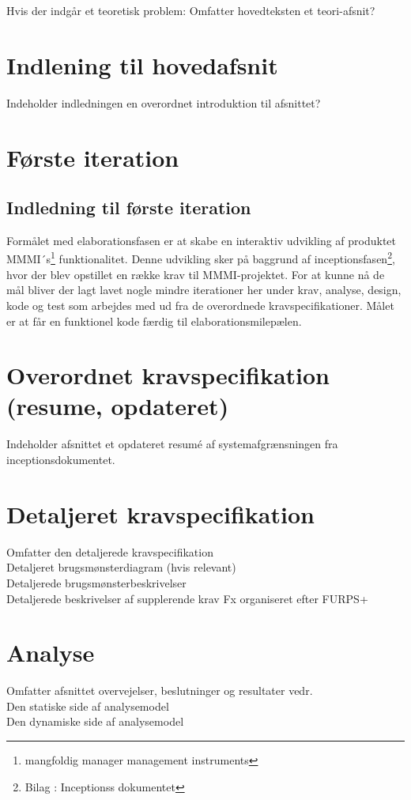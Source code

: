 Hvis der indgår et teoretisk problem: Omfatter hovedteksten et teori-afsnit?\\
\section{Indlening til hovedafsnit}
Indeholder indledningen en overordnet introduktion til afsnittet?\\
\section{Første iteration}
\subsection{Indledning til første iteration}
Formålet med elaborationsfasen er at skabe en interaktiv udvikling af produktet MMMI´s\footnote{{mangfoldig manager management instruments}} funktionalitet. Denne udvikling sker på baggrund af inceptionsfasen\footnote{{Bilag : Inceptionss dokumentet}}, hvor der blev opstillet en række krav til MMMI-projektet.  For at kunne nå de mål bliver der lagt lavet nogle mindre iterationer her under krav, analyse, design, kode og test som arbejdes med ud fra de overordnede kravspecifikationer. Målet er at får en funktionel kode færdig til elaborationsmilepælen. 



\section{Overordnet kravspecifikation (resume, opdateret)}
Indeholder afsnittet et opdateret resumé  af systemafgrænsningen fra inceptionsdokumentet.
\section{Detaljeret kravspecifikation}
Omfatter den detaljerede kravspecifikation\\
Detaljeret brugsmønsterdiagram (hvis relevant)\\
Detaljerede brugsmønsterbeskrivelser\\
Detaljerede beskrivelser af supplerende krav Fx organiseret efter FURPS+\\
\section{Analyse}
Omfatter afsnittet overvejelser, beslutninger og resultater vedr.\\
Den statiske side af analysemodel\\
Den dynamiske side af analysemodel\\
